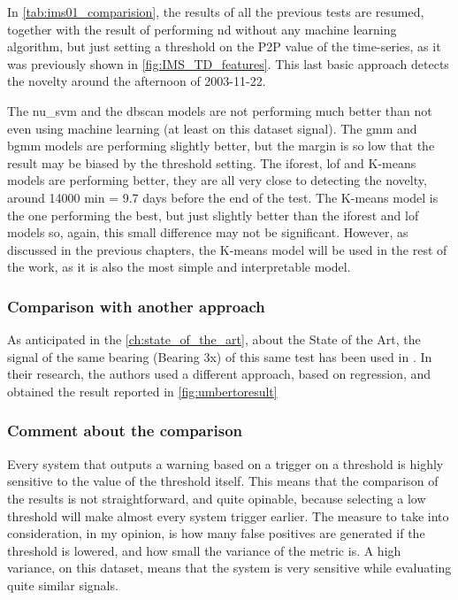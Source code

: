 In \autoref{tab:ims01_comparision}, the results of all the previous tests are resumed, together with the result of performing \gls{nd} without any machine learning algorithm, but just setting a threshold on the P2P value of the time-series, as it was previously shown in \autoref{fig:IMS_TD_features}. This last basic approach detects the novelty around the afternoon of 2003-11-22. 

The \gls{nu_svm} and the \gls{dbscan} models are not performing much better than not even using machine learning (at least on this dataset signal). The \gls{gmm} and \gls{bgmm} models are performing slightly better, but the margin is so low that the result may be biased by the threshold setting. The \gls{iforest}, \gls{lof} and K-means models are performing better, they are all very close to detecting the novelty, around 14000 min = 9.7 days before the end of the test. The K-means model is the one performing the best, but just slightly better than the \gls{iforest} and \gls{lof} models so, again, this small difference may not be significant. However, as discussed in the previous chapters, the K-means model will be used in the rest of the work, as it is also the most simple and interpretable model.


\subsubsection{Comparison with another approach}
As anticipated in the \autoref{ch:state_of_the_art}, about the State of the Art, the signal of the same bearing (Bearing 3x) of this same test has been used in \cite{Umberto}. In their research, the authors used a different approach, based on regression, and obtained the result reported in \autoref{fig:umbertoresult}


\subsubsection{Comment about the comparison}
Every system that outputs a warning based on a trigger on a threshold is highly sensitive to the value of the threshold itself. This means that the comparison of the results is not straightforward, and quite opinable, because selecting a low threshold will make almost every system trigger earlier. The measure to take into consideration, in my opinion, is how many false positives are generated if the threshold is lowered, and how small the variance of the metric is. A high variance, on this dataset, means that the system is very sensitive while evaluating quite similar signals.

